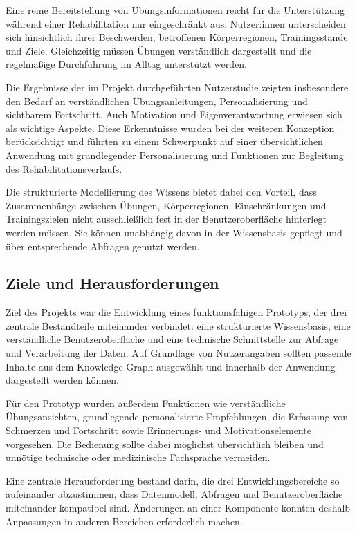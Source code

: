 Eine reine Bereitstellung von Übungsinformationen reicht für die Unterstützung während einer Rehabilitation nur eingeschränkt aus. Nutzer:innen unterscheiden sich hinsichtlich ihrer Beschwerden, betroffenen Körperregionen, Trainingsstände und Ziele. Gleichzeitig müssen Übungen verständlich dargestellt und die regelmäßige Durchführung im Alltag unterstützt werden.

Die Ergebnisse der im Projekt durchgeführten Nutzerstudie zeigten insbesondere den Bedarf an verständlichen Übungsanleitungen, Personalisierung und sichtbarem Fortschritt. Auch Motivation und Eigenverantwortung erwiesen sich als wichtige Aspekte. Diese Erkenntnisse wurden bei der weiteren Konzeption berücksichtigt und führten zu einem Schwerpunkt auf einer übersichtlichen Anwendung mit grundlegender Personalisierung und Funktionen zur Begleitung des Rehabilitationsverlaufs.

Die strukturierte Modellierung des Wissens bietet dabei den Vorteil, dass Zusammenhänge zwischen Übungen, Körperregionen, Einschränkungen und Trainingszielen nicht ausschließlich fest in der Benutzeroberfläche hinterlegt werden müssen. Sie können unabhängig davon in der Wissensbasis gepflegt und über entsprechende Abfragen genutzt werden.

\subsection{Ziele und Herausforderungen}

Ziel des Projekts war die Entwicklung eines funktionsfähigen Prototyps, der drei zentrale Bestandteile miteinander verbindet: eine strukturierte Wissensbasis, eine verständliche Benutzeroberfläche und eine technische Schnittstelle zur Abfrage und Verarbeitung der Daten. Auf Grundlage von Nutzerangaben sollten passende Inhalte aus dem Knowledge Graph ausgewählt und innerhalb der Anwendung dargestellt werden können.

Für den Prototyp wurden außerdem Funktionen wie verständliche Übungsansichten, grundlegende personalisierte Empfehlungen, die Erfassung von Schmerzen und Fortschritt sowie Erinnerungs- und Motivationselemente vorgesehen. Die Bedienung sollte dabei möglichst übersichtlich bleiben und unnötige technische oder medizinische Fachsprache vermeiden.

Eine zentrale Herausforderung bestand darin, die drei Entwicklungsbereiche so aufeinander abzustimmen, dass Datenmodell, Abfragen und Benutzeroberfläche miteinander kompatibel sind. Änderungen an einer Komponente konnten deshalb Anpassungen in anderen Bereichen erforderlich machen.

